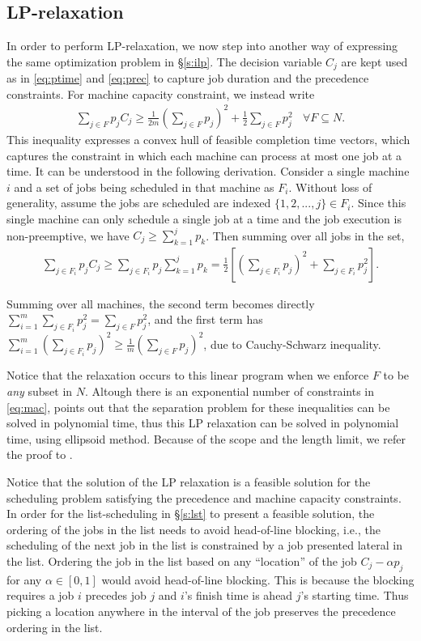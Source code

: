 \subsection{LP-relaxation} \label{s:lprd}
In order to perform LP-relaxation, we now step into another way of expressing the same optimization problem in \S\ref{s:ilp}. The decision variable $C_j$ are kept used as in \eqref{eq:ptime} and \eqref{eq:prec} to capture job duration and the precedence constraints. For machine capacity constraint, we instead write
\begin{align}
\sum_{j\in F} p_j C_j \geq \frac{1}{2m}\left(\sum_{j\in F} p_j \right)^2 + \frac{1}{2}\sum_{j\in F}p_j^2 \:\:\:\: \forall F \subseteq N. \label{eq:mac}
\end{align}
This inequality expresses a convex hull of feasible completion time vectors, which captures the constraint in which each machine can process at most one job at a time. It can be understood in the following derivation. Consider a single machine $i$ and a set of jobs being scheduled in that machine as $F_i$. Without loss of generality, assume the jobs are scheduled are indexed $\{1,2,...,j\} \in F_i$. Since this single machine can only schedule a single job at a time and the job execution is non-preemptive, we have $C_j \geq \sum_{k=1}^j p_k$. Then summing over all jobs in the set, 
\begin{align}
\sum_{j\in F_i} p_j C_j \geq \sum_{j\in F_i} p_j \sum_{k=1}^j p_k = \frac{1}{2} \left[ \left(\sum_{j\in F_i} p_j\right)^2 + \sum_{j\in F_i}p_j^2\right]. \label{eq:ch}
\end{align}

Summing over all machines, the second term becomes directly $\sum_{i=1}^m \sum_{j\in F_i}p_j^2 = \sum_{j\in F}p_j^2$, and the first term has $\sum_{i=1}^m\left(\sum_{j\in F_i} p_j\right)^2 \geq \frac{1}{m}\left(\sum_{j\in F} p_j\right)^2$, due to Cauchy-Schwarz inequality. 

Notice that the relaxation occurs to this linear program when we enforce $F$ to be \emph{any} subset in $N$. Altough there is an exponential number of constraints in \eqref{eq:mac}, \cite{queyranne2006approximation} points out that the separation problem for these inequalities can be solved in polynomial time, thus this LP relaxation can be solved in polynomial time, using ellipsoid method. Because of the scope and the length limit, we refer the proof to \cite{schulz1996scheduling}.

Notice that the solution of the LP relaxation is a feasible solution for the scheduling problem satisfying the precedence and machine capacity constraints. In order for the list-scheduling in \S\ref{s:lst} to present a feasible solution, the ordering of the jobs in the list needs to avoid head-of-line blocking, i.e., the scheduling of the next job in the list is constrained by a job presented lateral in the list. Ordering the job in the list based on any ``location'' of the job $C_j - \alpha p_j$ for any $\alpha \in [0,1]$ would avoid head-of-line blocking. This is because the blocking requires a job $i$ precedes job $j$ and $i$'s finish time is ahead $j$'s starting time. Thus picking a location anywhere in the interval of the job preserves the precedence ordering in the list.

